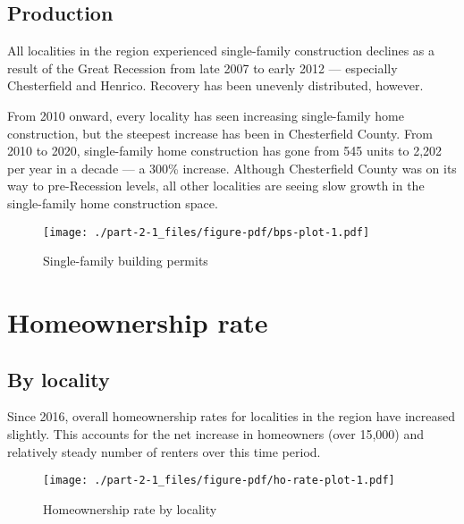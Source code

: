 \documentclass[
  letterpaper,
  DIV=11,
  numbers=noendperiod]{scrreprt}
\begin{document}
\hypertarget{production}{%
\subsection{Production}\label{production}}

All localities in the region experienced single-family construction
declines as a result of the Great Recession from late 2007 to early 2012
--- especially Chesterfield and Henrico. Recovery has been unevenly
distributed, however.

From 2010 onward, every locality has seen increasing single-family home
construction, but the steepest increase has been in Chesterfield County.
From 2010 to 2020, single-family home construction has gone from 545
units to 2,202 per year in a decade --- a 300\% increase. Although
Chesterfield County was on its way to pre-Recession levels, all other
localities are seeing slow growth in the single-family home construction
space.

\begin{figure}

{\centering \texttt{[image: ./part-2-1\_files/figure-pdf/bps-plot-1.pdf]}

}

\caption{Single-family building permits}

\end{figure}

\hypertarget{homeownership-rate}{%
\section{Homeownership rate}\label{homeownership-rate}}

\hypertarget{by-locality}{%
\subsection{By locality}\label{by-locality}}

Since 2016, overall homeownership rates for localities in the region
have increased slightly. This accounts for the net increase in
homeowners (over 15,000) and relatively steady number of renters over
this time period.

\begin{figure}

{\centering \texttt{[image: ./part-2-1\_files/figure-pdf/ho-rate-plot-1.pdf]}

}

\caption{Homeownership rate by locality}

\end{figure}
\end{document}
